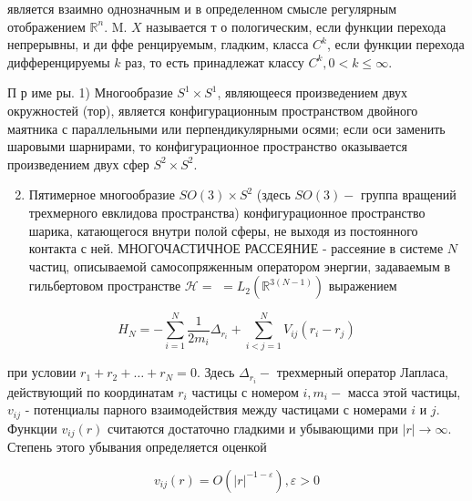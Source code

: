\documentclass[10pt]{article}
\begin{document}
является взаимно однозначным и в определенном смысле регулярным отображением $\mathbb{R}^{n}$. M. $X$ называется т о пологическим, если функции перехода непрерывны, и ди ффе ренцируемым, гладким, класса $C^{k}$, если функции перехода дифференцируемы $k$ раз, то есть принадлежат классу $C^{k}, 0<k \leqslant \infty$.



П р име ры. 1) Многообразие $S^{1} \times S^{1}$, являющееся произведением двух окружностей (тор), является конфигурационным пространством двойного маятника с параллельными или перпендикулярными осями; если оси заменить шаровыми шарнирами, то конфигурационное пространство оказывается произведением двух сфер $S^{2} \times S^{2}$.



\begin{enumerate}

  \setcounter{enumi}{1}

  \item Пятимерное многообразие $S O(3) \times S^{2}$ (здесь $S O(3)-$ группа вращений трехмерного евклидова пространства) конфигурационное пространство шарика, катающегося внутри полой сферы, не выходя из постоянного контакта с ней. МНОГОЧАСТИЧНОЕ РАССЕЯНИЕ - рассеяние в системе $N$ частиц, описываемой самосопряженным оператором энергии, задаваемым в гильбертовом пространстве $\mathscr{H}=$ $=L_{2}\left(\mathbb{R}^{3(N-1)}\right)$ выражением

\end{enumerate}



\[

H_{N}=-\sum_{i=1}^{N} \frac{1}{2 m_{i}} \Delta_{r_{i}}+\sum_{i<j=1}^{N} V_{i j}\left(r_{i}-r_{j}\right)

\]



при условии $r_{1}+r_{2}+\ldots+r_{N}=0$. Здесь $\Delta_{r_{i}}-$ трехмерный оператор Лапласа, действующий по координатам $r_{i}$ частицы с номером $i, m_{i}-$ масса этой частицы, $v_{i j}$ - потенциалы парного взаимодействия между частицами с номерами $i$ и $j$. Функции $v_{i j}(r)$ считаются достаточно гладкими и убывающими при $|r| \rightarrow \infty$. Степень этого убывания определяется оценкой



\[

v_{i j}(r)=O\left(|r|^{-1-\varepsilon}\right), \varepsilon>0

\]
\end{document}
